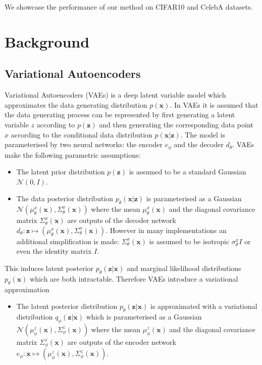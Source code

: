 We showcase the performance of our method on CIFAR10 \cite{cifar} and CelebA \cite{liu2015celeba} datasets.

\section{Background}
\subsection{Variational Autoencoders}
Variational Autoencoders (VAEs) \cite{vae, rezende2014vae2} is a deep latent variable model which approximates the data generating distribution $p(\textbf{x})$. In VAEs it is assumed that the data generating process can be represented by first generating a latent variable $z$ according to $p( \textbf{z})$ and then generating the corresponding data point $x$ according to the conditional data distribution $p(\textbf{x}| \textbf{z})$. The model is parameterised by two neural networks: the encoder $e_\phi$ and the decoder $d_\theta$. VAEs make the following parametric assumptions:
\begin{itemize}
    \item The latent prior distribution $p( \textbf{z})$ is assumed to be a standard Gaussian $\mathcal{N}(0, I)$.
    \item The data posterior distribution $p_\theta(\textbf{x} | \textbf{z})$  is parameterised as a Gaussian  $\mathcal{N}(\mu^x_\theta(\textbf{x}), \Sigma^x_\theta(\textbf{x}))$ where the mean $\mu^x_\theta(\textbf{x})$ and the diagonal covariance matrix $\Sigma^x_\theta(\textbf{x})$ are outputs of the decoder network $d_\theta: \textbf{z} \mapsto (\mu^x_\theta(\textbf{x}), \Sigma^x_\theta(\textbf{x}))$. However in many implementations an additional simplification is made: $\Sigma^x_\theta(\textbf{x})$ is assumed to be isotropic $\sigma^x_\theta I$ or even the identity matrix $I$.
\end{itemize}
This induces latent posterior $p_\theta( \textbf{z} | \textbf{x})$ and marginal likelihood distributions $p_\theta(\textbf{x})$ which are both intractable. Therefore VAEs introduce a variational approximation
\begin{itemize}
    \item The latent posterior distribution $p_\theta( \textbf{z} | \textbf{x})$ is approximated with a variational distribution $q_\phi( \textbf{z} | \textbf{x})$ which is parameterised as a Gaussian  $\mathcal{N}(\mu^z_\phi(\textbf{x}), \Sigma^z_\phi(\textbf{x}))$ where the mean $\mu^z_\phi(\textbf{x})$ and the diagonal covariance matrix $\Sigma^z_\phi(\textbf{x})$ are outputs of the encoder network $e_\phi: \textbf{x} \mapsto (\mu^z_\phi(\textbf{x}), \Sigma^z_\phi(\textbf{x}))$.
\end{itemize}

